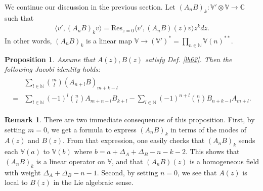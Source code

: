 \documentclass[12pt,a4paper,notitlepage]{article}
\theoremstyle{definition}
\newtheorem{rem}[df]{Remark}
\theoremstyle{plain}
\newtheorem{pp}[df]{Proposition}
\newcommand{\Res}{\mathrm{Res}}
\newcommand{\bk}[1]{\langle {#1}\rangle}
\newcommand{\Vbb}{\mathbb V}
\newcommand{\Cbb}{\mathbb C}
\newcommand{\Nbb}{\mathbb N}
\numberwithin{equation}{section}
\begin{document}
We continue our discussion in the previous section. Let $(A_nB)_k:\Vbb'\otimes\Vbb\rightarrow\Cbb$ such that
\begin{align*}
\bk{v',(A_nB)_kv}=\Res_{z=0}\bk{v',(A_nB)(z)v}z^kdz.	
\end{align*}
In other words, $(A_nB)_k$ is a linear map $\Vbb\rightarrow(\Vbb')^*=\prod_{n\in\Nbb}\Vbb(n)^{**}$.

\begin{pp}\label{lb71}
Assume that $A(z),B(z)$ satisfy Def. \ref{lb62}. Then the following Jacobi identity holds:
\begin{align}\label{eq107}
\begin{aligned}
&\sum_{l\in\Nbb}{m\choose l}(A_{n+l}B)_{m+k-l}\\
=&\sum_{l\in\Nbb}(-1)^l{n\choose l}A_{m+n-l}B_{k+l}-\sum_{l\in\Nbb}(-1)^{n+l}{n\choose l}B_{n+k-l} A_{m+l}.
\end{aligned}
\end{align}
\end{pp}

\begin{rem}
There are two immediate consequences of this proposition. First, by setting $m=0$, we get a formula to express $(A_nB)_k$ in terms of the modes of $A(z)$ and $B(z)$. From that expression, one easily checks that $(A_nB)_k$ sends each $\Vbb(a)$ to $\Vbb(b)$ where $b=a+\Delta_A+\Delta_B-n-k-2$. This shows that $(A_nB)_k$ is a linear operator on $\Vbb$, and that $(A_nB)(z)$ is a homogeneous field with weight $\Delta_A+\Delta_B-n-1$. Second, by setting $n=0$, we see that $A(z)$ is local to $B(z)$ in the Lie algebraic sense.
\end{rem}
\end{document}
